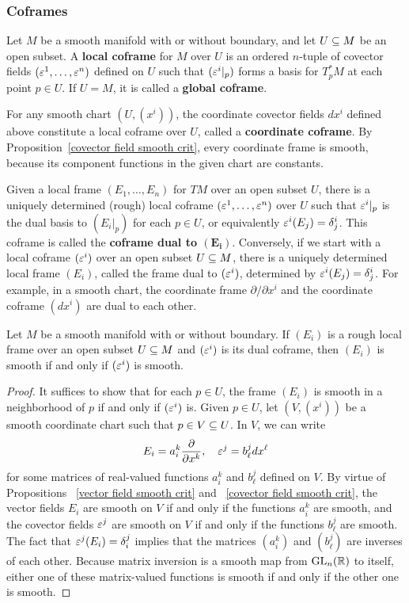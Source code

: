 \subsubsection{Coframes}
Let $M$ be a smooth manifold with or without boundary, and let $U\subseteq M$ be an open subset. A \textbf{local coframe} for $M$ over $U$ is an ordered $n$-tuple of covector fields $(\varepsilon^1,\dots,\varepsilon^n)$ defined on $U$ such that $(\varepsilon^i|_p)$ forms a basis for $T^*_pM$ at each point $p\in U$. If $U=M$, it is called a \textbf{global coframe}.
\begin{example}
For any smooth chart $(U,(x^i))$, the coordinate covector fields $dx^i$ defined above constitute a local coframe over $U$, called a \textbf{coordinate coframe}. By Proposition~\ref{covector field smooth crit}, every coordinate frame is smooth, because its component functions in the given chart are constants.
\end{example}
Given a local frame $(E_1,\dots,E_n)$ for $TM$ over an open subset $U$, there is a uniquely determined (rough) local coframe $(\varepsilon^1,\dots,\varepsilon^n)$ over $U$ such that $\varepsilon^i|_p$ is the dual basis to $(E_i|_p)$ for each $p\in U$, or equivalently $\varepsilon^i(E_j)=\delta^i_j$. This coframe is called the \textbf{coframe dual to $\bm{(E_i)}$}. Conversely, if we start with a local coframe $(\varepsilon^i)$ over an open subset $U\subseteq M$, there is a uniquely determined local frame $(E_i)$, called the frame dual to $(\varepsilon^i)$, determined by $\varepsilon^i(E_j)=\delta^i_j$. For example, in a smooth chart, the coordinate frame $\partial/\partial x^i$ and the coordinate coframe $(dx^i)$ are dual to each other.
\begin{lemma}\label{dual frame smooth iff}
Let $M$ be a smooth manifold with or without boundary. If $(E_i)$ is a rough local frame over an open subset $U\subseteq M$ and $(\varepsilon^i)$ is its dual coframe, then $(E_i)$ is smooth if and only if $(\varepsilon^i)$ is smooth.
\end{lemma}
\begin{proof}
It suffices to show that for each $p\in U$, the frame $(E_i)$ is smooth in a neighborhood of $p$ if and only if $(\varepsilon^i)$ is. Given $p\in U$, let $(V,(x^i))$ be a smooth coordinate chart such that $p\in V\subseteq U$. In $V$, we can write
\[E_i=a_i^k\frac{\partial}{\partial x^k},\quad \varepsilon^j=b^j_\ell dx^\ell\]
for some matrices of real-valued functions $a_i^k$ and $b^j_\ell$ defined on $V$. By virtue of Propositions ~\ref{vector field smooth crit} and ~\ref{covector field smooth crit}, the vector fields $E_i$ are smooth on $V$ if and only if the functions $a_i^k$ are smooth, and the covector fields $\varepsilon^j$ are smooth on $V$ if and only if the functions $b^j_\ell$ are smooth. The fact that $\varepsilon^j(E_i)=\delta^j_i$ implies that the matrices $(a_i^k)$ and $(b^j_\ell)$ are inverses of each other. Because matrix inversion is a smooth map from $\mathrm{GL}_n(\mathbb{R})$ to itself, either one of these matrix-valued functions is smooth if and only if the other one is smooth.
\end{proof}
